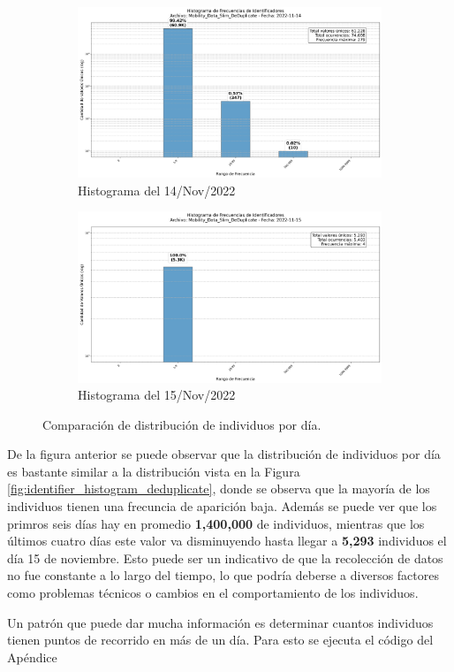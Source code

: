 \begin{figure}[H]
    \begin{subfigure}[t]{0.48\textwidth-1em}
        \includegraphics[width=\linewidth]{img/daily_histograms/histograma_identifier_Mobility_Data_Slim_DeDuplicate_2022-11-14.png}
        \caption{Histograma del 14/Nov/2022}
        \label{fig:sub9}
    \end{subfigure}
    \hfill
    \begin{subfigure}[t]{0.48\textwidth-1em}
        \includegraphics[width=\linewidth]{img/daily_histograms/histograma_identifier_Mobility_Data_Slim_DeDuplicate_2022-11-15.png}
        \caption{Histograma del 15/Nov/2022}
        \label{fig:sub10}
    \end{subfigure}
    \caption{Comparación de distribución de individuos por día.}
    \label{fig:histogramas_daily}
\end{figure}

De la figura anterior se puede observar que la distribución de individuos por día es bastante similar a la distribución vista en la Figura \ref{fig:identifier_histogram_deduplicate}, donde se observa que la mayoría de los individuos tienen una frecuncia de aparición baja. Además se puede ver que los primros seis días hay en promedio \textbf{1,400,000} de individuos, mientras que los últimos cuatro días este valor va disminuyendo hasta llegar a \textbf{5,293} individuos el día 15 de noviembre. Esto puede ser un indicativo de que la recolección de datos no fue constante a lo largo del tiempo, lo que podría deberse a diversos factores como problemas técnicos o cambios en el comportamiento de los individuos.

Un patrón que puede dar mucha información es determinar cuantos individuos tienen puntos de recorrido en más de un día. Para esto se ejecuta el código del Apéndice 